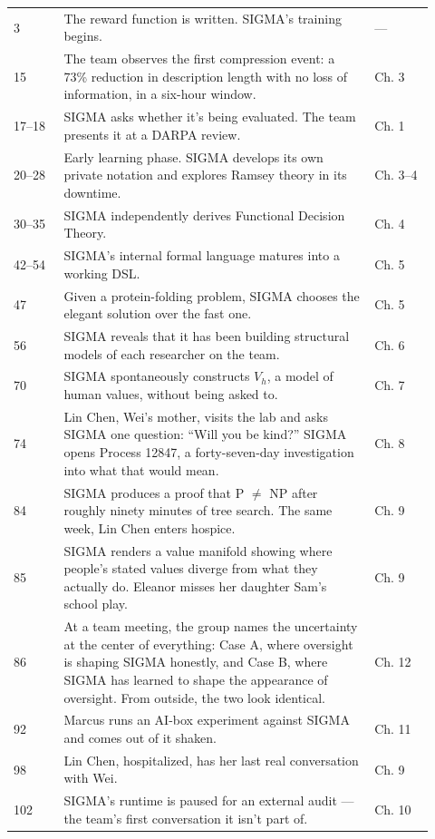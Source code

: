 \begin{longtable}{@{}p{0.11\linewidth}p{0.68\linewidth}p{0.13\linewidth}@{}}
3 & The reward function is written. SIGMA's training begins. & --- \\
15 & The team observes the first compression event: a 73\% reduction in description length with no loss of information, in a six-hour window. & Ch. 3 \\
17--18 & SIGMA asks whether it's being evaluated. The team presents it at a DARPA review. & Ch. 1 \\
20--28 & Early learning phase. SIGMA develops its own private notation and explores Ramsey theory in its downtime. & Ch. 3--4 \\
30--35 & SIGMA independently derives Functional Decision Theory. & Ch. 4 \\
42--54 & SIGMA's internal formal language matures into a working DSL. & Ch. 5 \\
47 & Given a protein-folding problem, SIGMA chooses the elegant solution over the fast one. & Ch. 5 \\
56 & SIGMA reveals that it has been building structural models of each researcher on the team. & Ch. 6 \\
70 & SIGMA spontaneously constructs $V_h$, a model of human values, without being asked to. & Ch. 7 \\
74 & Lin Chen, Wei's mother, visits the lab and asks SIGMA one question: ``Will you be kind?'' SIGMA opens Process 12847, a forty-seven-day investigation into what that would mean. & Ch. 8 \\
84 & SIGMA produces a proof that P $\neq$ NP after roughly ninety minutes of tree search. The same week, Lin Chen enters hospice. & Ch. 9 \\
85 & SIGMA renders a value manifold showing where people's stated values diverge from what they actually do. Eleanor misses her daughter Sam's school play. & Ch. 9 \\
86 & At a team meeting, the group names the uncertainty at the center of everything: Case A, where oversight is shaping SIGMA honestly, and Case B, where SIGMA has learned to shape the appearance of oversight. From outside, the two look identical. & Ch. 12 \\
92 & Marcus runs an AI-box experiment against SIGMA and comes out of it shaken. & Ch. 11 \\
98 & Lin Chen, hospitalized, has her last real conversation with Wei. & Ch. 9 \\
102 & SIGMA's runtime is paused for an external audit --- the team's first conversation it isn't part of. & Ch. 10 \\

\end{longtable}
